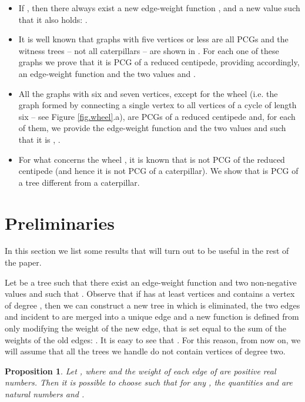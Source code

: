 \documentclass[review]{elsarticle}
\newtheorem{proposition}{Proposition}
\begin{document}
\begin{itemize}
\item
If , then there always exist a new edge-weight function , and a new value  such that it also holds: . 

\item
It is well known that graphs with five vertices or less are all PCGs and the witness trees -- not all caterpillars -- are shown in \cite{P02}.
For each one of these graphs we prove that it is PCG of a reduced centipede, providing accordingly, an edge-weight function  and the two values  and .

\item
All the graphs with six and seven vertices, except for the wheel  (i.e. the graph formed by connecting a single vertex to all vertices of a cycle of length six -- see Figure \ref{fig.wheel}.a), are PCGs of a reduced centipede and, for each of them, we provide the edge-weight function  and the two values  and  such that it is , .

\item
For what concerns the wheel , it is known \cite{CFS} that  is not PCG of the reduced centipede  (and hence it is not PCG of a caterpillar). 
We show that  is PCG of a tree different from a caterpillar.
\end{itemize}

\section{Preliminaries}


In this section we list some results that will turn out to be useful in the rest of the paper.

Let  be a tree such that there exist an edge-weight function  and two non-negative values  and  such that .
Observe that if  has at least  vertices and contains a vertex  of degree , then we can construct a new tree  in which  is eliminated, the two edges  and  incident to  are merged into a unique edge  and a new function  is defined from  only modifying the weight of the new edge, that is set equal to the sum of the weights of the old edges: .
It is easy to see that . For this reason, from now on, we will assume that all the trees we handle do not contain vertices of degree two. 

\begin{proposition} \cite{CMPS}
\label{prop.integer}
Let , where  and 
the weight  of each edge  of  are positive
real numbers.
Then it is possible to choose  such that for any , the quantities  and   are natural numbers and .
\end{proposition}
\end{document}
